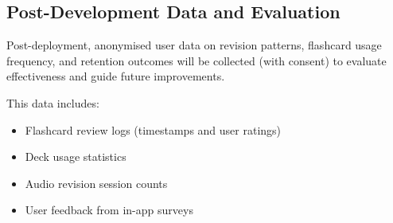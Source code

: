 \documentclass[a4paper,12pt]{article}
\begin{document}
\subsection{Post-Development Data and Evaluation}

Post-deployment, anonymised user data on revision patterns, flashcard usage frequency, and retention outcomes will be collected (with consent) to evaluate effectiveness and guide future improvements.

This data includes:

\begin{itemize}
  \item Flashcard review logs (timestamps and user ratings)
  \item Deck usage statistics
  \item Audio revision session counts
  \item User feedback from in-app surveys
\end{itemize}
\end{document}
